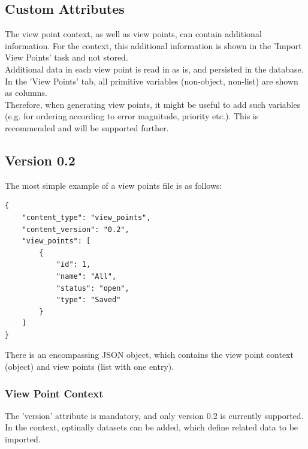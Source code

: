 \subsection{Custom Attributes}
\label{sec:view_points_custom_attributes} 

The view point context, as well as view points, can contain additional information. For the context, this additional information is shown in the 'Import View Points' task and not stored. \\

Additional data in each view point is read in as is, and persisted in the database. In the 'View Points' tab, all primitive variables (non-object, non-list) are shown as columns. \\

Therefore, when generating view points, it might be useful to add such variables (e.g. for ordering according to error magnitude, priority etc.). This is recommended and will be supported further.
 
\subsection{Version 0.2}

The most simple example of a view points file is as follows:

\begin{lstlisting}[basicstyle=\small\ttfamily]
{
    "content_type": "view_points",
    "content_version": "0.2",
    "view_points": [
        {
            "id": 1,
            "name": "All",
            "status": "open",
            "type": "Saved"
        }
    ]
}
\end{lstlisting}

There is an encompassing JSON object, which contains the view point context (object) and view points (list with one entry). \\

\subsubsection{View Point Context}

The 'version' attribute is mandatory, and only version 0.2 is currently supported. \\

In the context, optinally datasets can be added, which define related data to be imported.

